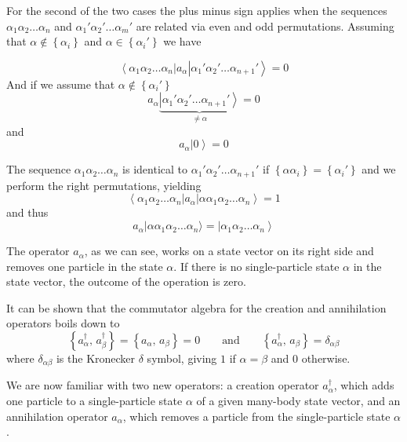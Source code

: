 For the second of the two cases the plus minus sign applies when the sequences $\alpha_{1}\alpha_{2}\dots\alpha_{n}$ and $\alpha_{1}'\alpha_{2}'\dots\alpha_{m}'$ are related via even and odd permutations. Assuming that $\alpha \notin \left\{\alpha_{i}\right\}$ and $\alpha \in \left\{\alpha_{i}'\right\}$ we have

\[
	\left\langle\alpha_{1}\alpha_{2}\dots\alpha_{n}\right | a_{\alpha} \left | \alpha_{1}'\alpha_{2}'\dots\alpha_{n+1}'\right\rangle = 0
\]
And if we assume that $\alpha \notin \left\{\alpha_{i}'\right\}$
\[
	a_{\alpha}\underset{\neq\alpha}{\underbrace{\left|\alpha_{1}'\alpha_{2}'\dots\alpha_{n+1}'\right\rangle }}=0
\]
and 
\[
	a_{\alpha}\left | 0 \right\rangle=0
\]

The sequence $\alpha_{1}\alpha_{2}\dots\alpha_{n}$ is identical to $\alpha_{1}'\alpha_{2}'\dots\alpha_{n+1}'$ if $\left\{\alpha\alpha_{i}\right\}=\left\{\alpha_{i}'\right\}$ and we perform the right permutations, yielding
\[
	\left\langle \alpha_{1}\alpha_{2}\dots\alpha_{n} \right | a_{\alpha} \left | \alpha \alpha_{1}\alpha_{2}\dots\alpha_{n} \right \rangle = 1
\]
and thus 
\[
	a_{\alpha} \left | \alpha \alpha_{1}\alpha_{2}\dots\alpha_{n} \rangle = | \alpha_{1}\alpha_{2}\dots\alpha_{n} \right \rangle
\]

The operator $a_{\alpha}$, as we can see, works on a state vector on its right side and removes one particle in the state $\alpha$. If there is no single-particle state $\alpha$ in the state vector, the outcome of the operation is zero. 

It can be shown that the commutator algebra for the creation and annihilation operators boils down to 
\[
\left\{ a_{\alpha}^{\dagger},\, a_{\beta}^{\dagger}\right\} =\left\{ a_{\alpha},\, a_{\beta}\right\} =0\qquad\mbox{and}\qquad\left\{ a_{\alpha}^{\dagger},\, a_{\beta}\right\} =\delta_{\alpha\beta}
\]
where $\delta_{\alpha\beta}$ is the Kronecker $\delta$ symbol, giving $1$ if $\alpha=\beta$ and $0$ otherwise.

We are now familiar with two new operators: a creation operator $a_{\alpha}^{\dagger}$, which adds one particle to a single-particle state $\alpha$ of a given many-body state vector, and an annihilation operator $a_{\alpha}$, which removes a particle from the single-particle state $\alpha$.

